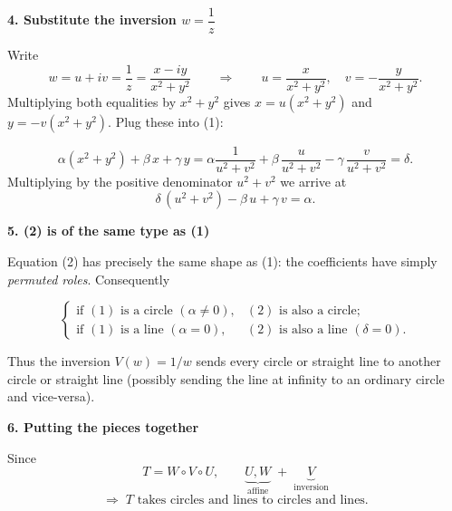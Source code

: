 \documentclass[12pt]{article}
\theoremstyle{definition} %
\theoremstyle{plain} %
\begin{document}
\bigskip
\textbf{4.  Substitute the inversion \(w=\dfrac{1}{z}\)}

Write
\[
   w=u+iv=\frac{1}{z}=\frac{x-iy}{x^{2}+y^{2}}
   \qquad\Longrightarrow\qquad
   u=\frac{x}{x^{2}+y^{2}},\quad
   v=-\frac{y}{x^{2}+y^{2}}.
\]
Multiplying both equalities by \(x^{2}+y^{2}\) gives
\(x= u(x^{2}+y^{2})\) and \(y= -v(x^{2}+y^{2})\).
Plug these into (1):

\[
   \alpha(x^{2}+y^{2})+\beta\,x+\gamma\,y
   =\alpha\frac{1}{u^{2}+v^{2}}
     +\beta\,\frac{u}{u^{2}+v^{2}}
     -\gamma\,\frac{v}{u^{2}+v^{2}}
   =\delta.
\]
Multiplying by the positive denominator \(u^{2}+v^{2}\) we arrive at
\[
   \boxed{\;\delta\,(u^{2}+v^{2})-\beta\,u+\gamma\,v=\alpha.\;}
   \tag{2}
\]

\bigskip
\textbf{5.  (2) is of the same type as (1)}

Equation (2) has precisely the same
shape as (1): the coefficients have simply
\emph{permuted roles}.
Consequently

\[
   \begin{cases}
     \text{if }(1)\text{ is a circle }(\alpha\neq 0),&
       (2)\text{ is also a circle;}\\[4pt]
     \text{if }(1)\text{ is a line }(\alpha=0),&
       (2)\text{ is also a line }(\delta=0).
   \end{cases}
\]

Thus the inversion \(V(w)=1/w\) sends every circle or straight line to
another circle or straight line (possibly sending the line at infinity
to an ordinary circle and vice-versa).

\bigskip
\textbf{6.  Putting the pieces together}

Since
\[
   T = W\circ V\circ U,\qquad
   \underbrace{U,W}_{\text{affine}}\;+\;
   \underbrace{V}_{\text{inversion}}
\]
\[
   \Longrightarrow\;
   T \text{ takes circles and lines to circles and lines.}
\]
\end{document}
